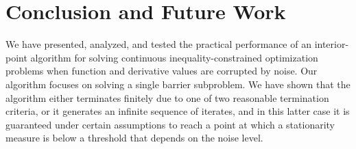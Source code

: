 
\section{Conclusion and Future Work}\label{sec.conclusion_4}

We have presented, analyzed, and tested the practical performance of an interior-point algorithm for solving continuous inequality-constrained optimization problems when function and derivative values are corrupted by noise.  Our algorithm focuses on solving a single barrier subproblem.  We have shown that the algorithm either terminates finitely due to one of two reasonable termination criteria, or it generates an infinite sequence of iterates, and in this latter case it is guaranteed under certain assumptions to reach a point at which a stationarity measure is below a threshold that depends on the noise level.

